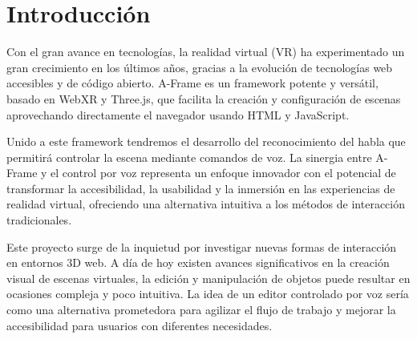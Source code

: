 \documentclass[a4paper, 12pt]{book}
\let\cleardoublepage\clearpage
\begin{document}

\tableofcontents 
\cleardoublepage
\listoffigures %



\cleardoublepage
\chapter{Introducción}
\label{sec:intro} %
Con el gran avance en tecnologías, la realidad virtual (VR) ha experimentado un gran crecimiento en los últimos años, gracias a la evolución de tecnologías web accesibles y de código abierto. 
A-Frame es un framework potente y versátil, basado en WebXR y Three.js, que facilita la creación y configuración de escenas aprovechando directamente el navegador usando HTML y JavaScript.

Unido a este framework tendremos el desarrollo del reconocimiento del habla que permitirá controlar la escena mediante comandos de voz.
La sinergia entre A-Frame y el control por voz representa un enfoque innovador con el potencial de transformar la accesibilidad, la usabilidad y la inmersión en las experiencias de realidad virtual, ofreciendo una alternativa intuitiva a los métodos de interacción tradicionales.

Este proyecto surge de la inquietud por investigar nuevas formas de interacción en entornos 3D web. 
A día de hoy existen avances significativos en la creación visual de escenas virtuales, 
la edición y manipulación de objetos puede resultar en ocasiones compleja y poco intuitiva. 
La idea de un editor controlado por voz sería como una alternativa prometedora para agilizar el flujo de trabajo y mejorar la accesibilidad para usuarios con diferentes necesidades.
\end{document}

